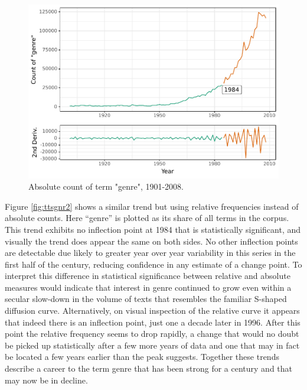 \documentclass[]{book}
\theoremstyle{definition}
\theoremstyle{definition}
\theoremstyle{definition}
\theoremstyle{remark}
\begin{document}
\begin{figure}

{\centering \includegraphics[width=0.9\linewidth]{03_files/figure-latex/ttsgnr-1} 

}

\caption{Absolute count of term "genre", 1901-2008.}\label{fig:ttsgnr}
\end{figure}

Figure \ref{fig:ttsgnr2} shows a similar trend but using relative
frequencies instead of absolute counts. Here ``genre'' is plotted as its
share of all terms in the corpus. This trend exhibits no inflection
point at 1984 that is statistically significant, and visually the trend
does appear the same on both sides. No other inflection points are
detectable due likely to greater year over year variability in this
series in the first half of the century, reducing confidence in any
estimate of a change point. To interpret this difference in statistical
significance between relative and absolute measures would indicate that
interest in genre continued to grow even within a secular slow-down in
the volume of texts that resembles the familiar S-shaped diffusion
curve. Alternatively, on visual inspection of the relative curve it
appears that indeed there is an inflection point, just one a decade
later in 1996. After this point the relative frequency seems to drop
rapidly, a change that would no doubt be picked up statistically after a
few more years of data and one that may in fact be located a few years
earlier than the peak suggests. Together these trends describe a career
to the term genre that has been strong for a century and that may now be
in decline.
\end{document}

